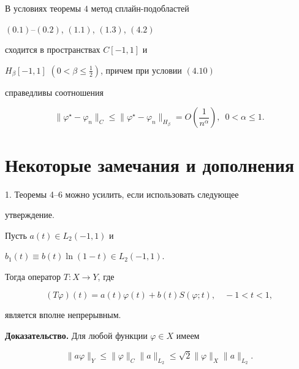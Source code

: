 \begin{thm}


В условиях теоремы $4$ метод сплайн-подобластей 


$(0.1)$--$(0.2)$, $(1.1)$, $(1.3)$, $(4.2)$


сходится в пространствах $C[-1, 1]$ и


$H_\beta[-1, 1]$ $(0<\beta\leq\frac{1}{2})$, причем при условии $(4.10)$


справедливы соотношения


$$


\|\varphi^{\star}-\varphi_n\|_C\leq\|\varphi^{\star}-\varphi_n


\|_{H_{\beta}}=O\left(\frac{1}{n^{\alpha}}\right),\ \; 0<\alpha\leq 1. 


$$


\end{thm}





\section{Некоторые замечания и дополнения}





1. Теоремы 4--6 можно усилить, если использовать следующее


утверждение.





\begin{lem}


Пусть $a(t)\in L_2(-1, 1)$ и


$b_1(t)\equiv b(t)\ln(1-t)\in L_2(-1, 1)$. 





Тогда оператор $T:X\to Y$, где


$$


(T\varphi)(t)=a(t)\varphi(t)+b(t)S(\varphi;t), \quad -1<t<1, 


$$


является вполне непрерывным.


\end{lem}





{\bf Доказательство.} Для любой функции $\varphi\in X$ имеем


\begin{equation}


\| a\varphi\|_Y\leq\|\varphi\|_C\| a\|_{L_2}\leq


\sqrt{2}\|\varphi\|_X\| a\|_{L_2}. 


\end{equation}


